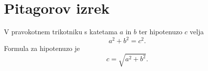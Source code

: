 \documentclass{article}
\begin{document}
\section*{Pitagorov izrek}
V pravokotnem trikotniku s katetama \(a\) in \(b\) ter hipotenuzo \(c\) velja
\[ a^2 + b^2 = c^2 . \] Formula za hipotenuzo je \[ c = \sqrt{a^2 + b^2} .\] 
\end{document}
